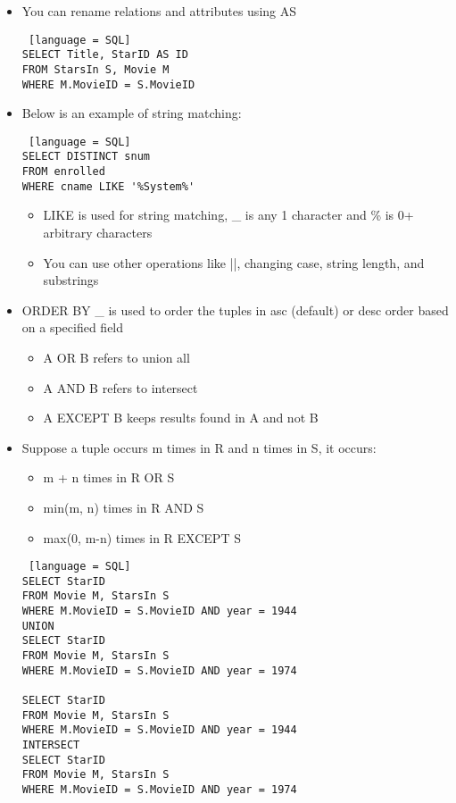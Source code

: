 \documentclass[8pt,landscape,a4paper, fleqn, dvipsnames]{extarticle}
\begin{document}
\begin{multicols*}{4}
\begin{itemize}
\begin{itemize}
    \end{itemize}
    \item You can rename relations and attributes using AS
    \begin{lstlisting} [language = SQL]
SELECT Title, StarID AS ID
FROM StarsIn S, Movie M
WHERE M.MovieID = S.MovieID
    \end{lstlisting}
    \item Below is an example of string matching:
    \begin{lstlisting} [language = SQL]
SELECT DISTINCT snum
FROM enrolled
WHERE cname LIKE '%System%'
    \end{lstlisting}
    \begin{itemize}
        \item LIKE is used for string matching, \_ is any 1 character and \% is 0+ arbitrary characters
        \item You can use other operations like ||, changing case, string length, and substrings
    \end{itemize}
    \item ORDER BY \_ is used to order the tuples in asc (default) or desc order based on a specified field
    \begin{itemize}
        \item A OR B refers to union all
        \item A AND B refers to intersect
        \item A EXCEPT B keeps results found in A and not B
    \end{itemize}
    \item Suppose a tuple occurs m times in R and n times in S, it occurs:
    \begin{itemize}
        \item m + n times in R OR S
        \item min(m, n) times in R AND S
        \item max(0, m-n) times in R EXCEPT S
    \end{itemize}
    \begin{lstlisting} [language = SQL]
SELECT StarID
FROM Movie M, StarsIn S
WHERE M.MovieID = S.MovieID AND year = 1944
UNION
SELECT StarID
FROM Movie M, StarsIn S
WHERE M.MovieID = S.MovieID AND year = 1974

SELECT StarID
FROM Movie M, StarsIn S
WHERE M.MovieID = S.MovieID AND year = 1944
INTERSECT
SELECT StarID
FROM Movie M, StarsIn S
WHERE M.MovieID = S.MovieID AND year = 1974


\end{lstlisting}
\end{itemize}
\end{multicols*}
\end{document}
